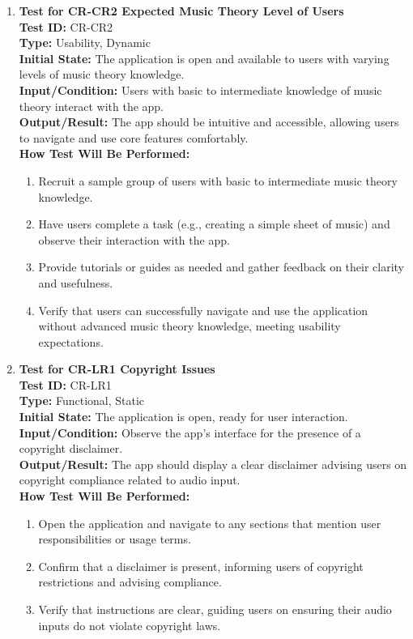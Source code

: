 \documentclass[12pt, titlepage]{article}
\begin{document}
\begin{enumerate}
    \item \textbf{Test for CR-CR2 Expected Music Theory Level of Users} \\
      \newline
      \textbf{Test ID:} CR-CR2 \\
      \textbf{Type:} Usability, Dynamic \\
      \textbf{Initial State:} The application is open and available to users with varying levels of music theory knowledge. \\
      \textbf{Input/Condition:} Users with basic to intermediate knowledge of music theory interact with the app. \\
      \textbf{Output/Result:} The app should be intuitive and accessible, allowing users to navigate and use core features comfortably. \\
      \textbf{How Test Will Be Performed:}
      \begin{enumerate}
          \item Recruit a sample group of users with basic to intermediate music theory knowledge.
          \item Have users complete a task (e.g., creating a simple sheet of music) and observe their interaction with the app.
          \item Provide tutorials or guides as needed and gather feedback on their clarity and usefulness.
          \item Verify that users can successfully navigate and use the application without advanced music theory knowledge, meeting usability expectations.
      \end{enumerate}

    \item \textbf{Test for CR-LR1 Copyright Issues} \\
      \newline
      \textbf{Test ID:} CR-LR1 \\
      \textbf{Type:} Functional, Static \\
      \textbf{Initial State:} The application is open, ready for user interaction. \\
      \textbf{Input/Condition:} Observe the app’s interface for the presence of a copyright disclaimer. \\
      \textbf{Output/Result:} The app should display a clear disclaimer advising users on copyright compliance related to audio input. \\
      \textbf{How Test Will Be Performed:}
      \begin{enumerate}
          \item Open the application and navigate to any sections that mention user responsibilities or usage terms.
          \item Confirm that a disclaimer is present, informing users of copyright restrictions and advising compliance.
          \item Verify that instructions are clear, guiding users on ensuring their audio inputs do not violate copyright laws.
      \end{enumerate}


\end{enumerate}
\end{document}
